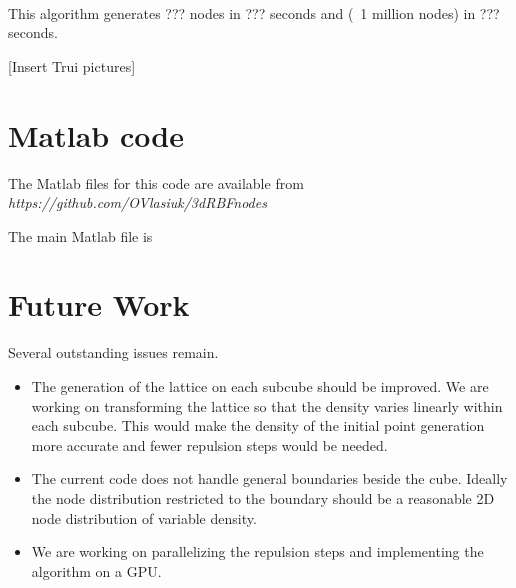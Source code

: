 \documentclass[]{article}
\begin{document}
\

This algorithm generates ??? nodes in ??? seconds and (~1 million nodes) in ??? seconds.

[Insert Trui pictures]



\section{Matlab code}

The Matlab files for this code are available from \textit{https://github.com/OVlasiuk/3dRBFnodes}

The main Matlab file is 

\section{Future Work}

Several outstanding issues remain. 
\begin{itemize}
\item The generation of the lattice on each subcube should be improved. We are working on transforming the lattice so that the density varies linearly within each subcube. This would make the density of the initial point generation more accurate and fewer repulsion steps would be needed.
\item The current code does not handle general boundaries beside the cube. Ideally the node distribution restricted to the boundary should be a reasonable 2D node distribution of variable density.
\item We are working on parallelizing the repulsion steps and implementing the algorithm on a GPU.
\end{itemize}
\end{document}
